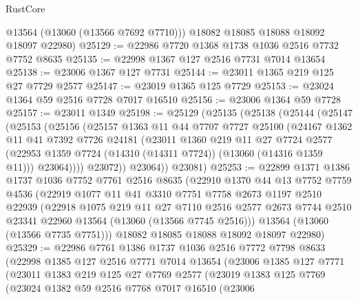 \begin{lexlean}{RustCore}
\begin{coremodule}
        @13564
        (@13060 (@13566 @7692 @7710)))
      @18082
      @18085
      @18088
      @18092
      @18097
      @22980)
@25129 := @22986 @7720 @1368 @1738 @1036 @2516 @7732 @7752 @8635
@25135 := @22998 @1367 @127 @2516 @7731 @7014 @13654
@25138 := @23006 @1367 @127 @7731
@25144 := @23011 @1365 @219 @125 @27 @7729 @2577
@25147 := @23019 @1365 @125 @7729
@25153 := @23024 @1364 @59 @2516 @7728 @7017 @16510
@25156 := @23006 @1364 @59 @7728
@25157 := @23011 @1349
@25198 := @25129
    (@25135
      (@25138
        (@25144
          (@25147
            (@25153
              (@25156
                (@25157
                  @1363
                  @11
                  @44
                  @7707
                  @7727
                  @25100
                  (@24167
                    @1362
                    @11
                    @41
                    @7392
                    @7726
                    @24181
                    (@23011
                      @1360
                      @219
                      @11
                      @27
                      @7724
                      @2577
                      (@22953 @1359 @7724 (@14310 (@14311 @7724)) (@13060 (@14316 @1359 @11)))
                      @23064))))
              @23072))
          @23064))
      @23081)
@25253 := @22899
    @1371
    @1386
    @1737
    @1036
    @7752
    @7761
    @2516
    @8635
    (@22910
      @1370
      @44
      @13
      @7752
      @7759
      @4536
      (@22919
        @1077
        @11
        @41
        @3310
        @7751
        @7758
        @2673
        @1197
        @2510
        @22939
        (@22918
          @1075
          @219
          @11
          @27
          @7110
          @2516
          @2577
          @2673
          @7744
          @2510
          @23341
          @22960
          @13564
          (@13060 (@13566 @7745 @2516)))
        @13564
        (@13060 (@13566 @7735 @7751)))
      @18082
      @18085
      @18088
      @18092
      @18097
      @22980)
@25329 := @22986
    @7761
    @1386
    @1737
    @1036
    @2516
    @7772
    @7798
    @8633
    (@22998
      @1385
      @127
      @2516
      @7771
      @7014
      @13654
      (@23006
        @1385
        @127
        @7771
        (@23011
          @1383
          @219
          @125
          @27
          @7769
          @2577
          (@23019
            @1383
            @125
            @7769
            (@23024
              @1382
              @59
              @2516
              @7768
              @7017
              @16510
              (@23006

\end{coremodule}
\end{lexlean}
